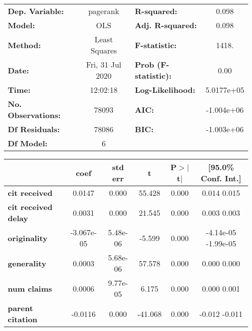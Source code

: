 \begin{center}
\begin{tabular}{lclc}
\toprule
\textbf{Dep. Variable:}     &     pagerank     & \textbf{  R-squared:         } &       0.098    \\
\textbf{Model:}             &       OLS        & \textbf{  Adj. R-squared:    } &       0.098    \\
\textbf{Method:}            &  Least Squares   & \textbf{  F-statistic:       } &       1418.    \\
\textbf{Date:}              & Fri, 31 Jul 2020 & \textbf{  Prob (F-statistic):} &       0.00     \\
\textbf{Time:}              &     12:02:18     & \textbf{  Log-Likelihood:    } &   5.0177e+05   \\
\textbf{No. Observations:}  &       78093      & \textbf{  AIC:               } &   -1.004e+06   \\
\textbf{Df Residuals:}      &       78086      & \textbf{  BIC:               } &   -1.003e+06   \\
\textbf{Df Model:}          &           6      & \textbf{                     } &                \\
\bottomrule
\end{tabular}
\begin{tabular}{lccccc}
                            & \textbf{coef} & \textbf{std err} & \textbf{t} & \textbf{P$>$$|$t$|$} & \textbf{[95.0\% Conf. Int.]}  \\
\midrule
\textbf{cit received}       &       0.0147  &        0.000     &    55.428  &         0.000        &         0.014     0.015       \\
\textbf{cit received delay} &       0.0031  &        0.000     &    21.545  &         0.000        &         0.003     0.003       \\
\textbf{originality}        &   -3.067e-05  &     5.48e-06     &    -5.599  &         0.000        &     -4.14e-05 -1.99e-05       \\
\textbf{generality}         &       0.0003  &     5.68e-06     &    57.578  &         0.000        &         0.000     0.000       \\
\textbf{num claims}         &       0.0006  &     9.77e-05     &     6.175  &         0.000        &         0.000     0.001       \\
\textbf{parent citation}    &      -0.0116  &        0.000     &   -41.068  &         0.000        &        -0.012    -0.011       \\

\end{tabular}
\end{center}
